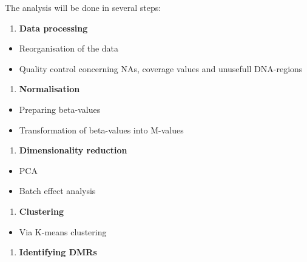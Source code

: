 \documentclass[]{article}
\providecommand{\tightlist}{%
  \setlength{\itemsep}{0pt}\setlength{\parskip}{0pt}}
\begin{document}
The analysis will be done in several steps:

\begin{enumerate}
\def\labelenumi{\arabic{enumi}.}
\tightlist
\item
  \textbf{Data processing}
\end{enumerate}

\begin{itemize}
\tightlist
\item
  Reorganisation of the data
\item
  Quality control concerning NAs, coverage values and unusefull
  DNA-regions
\end{itemize}

\begin{enumerate}
\def\labelenumi{\arabic{enumi}.}
\setcounter{enumi}{1}
\tightlist
\item
  \textbf{Normalisation}
\end{enumerate}

\begin{itemize}
\tightlist
\item
  Preparing beta-values
\item
  Transformation of beta-values into M-values
\end{itemize}

\begin{enumerate}
\def\labelenumi{\arabic{enumi}.}
\setcounter{enumi}{2}
\tightlist
\item
  \textbf{Dimensionality reduction}
\end{enumerate}

\begin{itemize}
\tightlist
\item
  PCA
\item
  Batch effect analysis
\end{itemize}

\begin{enumerate}
\def\labelenumi{\arabic{enumi}.}
\setcounter{enumi}{3}
\tightlist
\item
  \textbf{Clustering}
\end{enumerate}

\begin{itemize}
\tightlist
\item
  Via K-means clustering
\end{itemize}

\begin{enumerate}
\def\labelenumi{\arabic{enumi}.}
\setcounter{enumi}{4}
\tightlist
\item
  \textbf{Identifying DMRs}
\end{enumerate}
\end{document}
